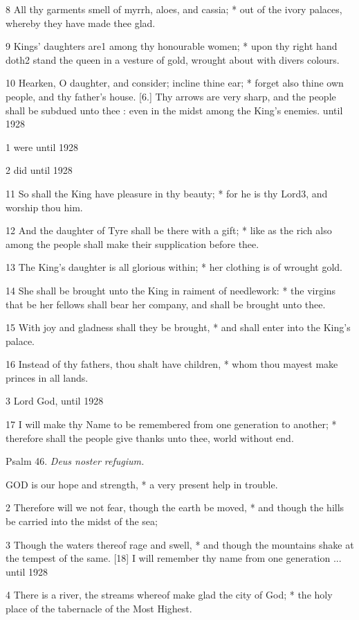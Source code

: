 8 All thy garments smell of myrrh, aloes, and cassia;
* out of the ivory palaces, whereby they have made thee glad.

9 Kings’ daughters are1 among thy honourable
women; * upon thy right hand doth2 stand the queen in a vesture
of gold, wrought about with divers colours.

10 Hearken, O daughter, and consider; incline thine ear;
* forget also thine own people, and thy father's house. [6.] Thy arrows are very sharp,
and the people shall be subdued unto thee : even in the midst among the
King's enemies. until
1928

1 were until
1928

2 did until
1928

11 So shall the King have pleasure in thy beauty; * for
he is thy Lord3, and worship thou him.

12 And the daughter of Tyre shall be there with a gift;
* like as the rich also among the people shall make their supplication before
thee.

13 The King’s daughter is all glorious within;
* her clothing is of wrought gold.

14 She shall be brought unto the King in raiment of needlework:
* the virgins that be her fellows shall bear her company, and shall be brought
unto thee.

15 With joy and gladness shall they be brought, * and
shall enter into the King's palace.

16 Instead of thy fathers, thou shalt have children,
* whom thou mayest make princes in all lands.

3 Lord God, until
1928

17 I will make thy Name to be remembered from one generation to another;
* therefore shall the people give thanks unto thee, world without end.

Psalm
46. \emph{Deus noster refugium.}

GOD
is our hope and strength, * a very present help in trouble.

2 Therefore will we not fear, though the earth be moved,
* and though the hills be carried into the midst of the sea;

3 Though the waters thereof rage and swell, * and though
the mountains shake at the tempest of the same. [18] I will remember thy name
from one generation ...
until 1928

4 There is a river, the streams whereof make glad the
city of God; * the holy place of the tabernacle of the Most Highest.

